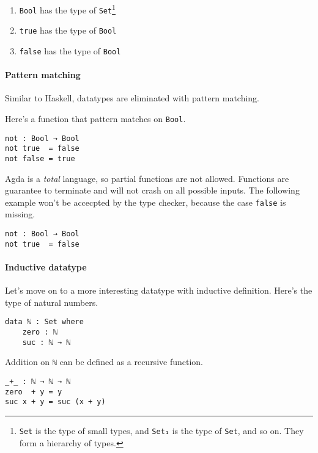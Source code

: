 \documentclass[12pt, a4paper]{article}
\begin{document}
\begin{enumerate}
    \item {\lstinline|Bool|} has the type of {\lstinline|Set|}\footnote{{\lstinline|Set|} is the type of small types, and {\lstinline|Set₁|} is the type
of {\lstinline|Set|}, and so on. They form a hierarchy of types.}
    \item {\lstinline|true|} has the type of {\lstinline|Bool|}
    \item {\lstinline|false|} has the type of {\lstinline|Bool|}
\end{enumerate}

\paragraph{Pattern matching}

Similar to Haskell, datatypes are eliminated with pattern matching.

Here's a function that pattern matches on {\lstinline|Bool|}.

\begin{lstlisting}
not : Bool → Bool
not true  = false
not false = true
\end{lstlisting}

Agda is a \textit{total} language, so partial functions are not allowed. Functions
are guarantee to terminate and will not crash on all possible inputs. The following
example won't be accecpted by the type checker, because the case {\lstinline|false|} is missing.

\begin{lstlisting}
not : Bool → Bool
not true  = false
\end{lstlisting}

\paragraph{Inductive datatype} Let's move on to a more interesting datatype with inductive definition. Here's the type of natural numbers.

\begin{lstlisting}
data ℕ : Set where
    zero : ℕ
    suc : ℕ → ℕ
\end{lstlisting}

Addition on {\lstinline|ℕ|} can be defined as a recursive function.

\begin{lstlisting}
_+_ : ℕ → ℕ → ℕ
zero  + y = y
suc x + y = suc (x + y)
\end{lstlisting}
\end{document}
